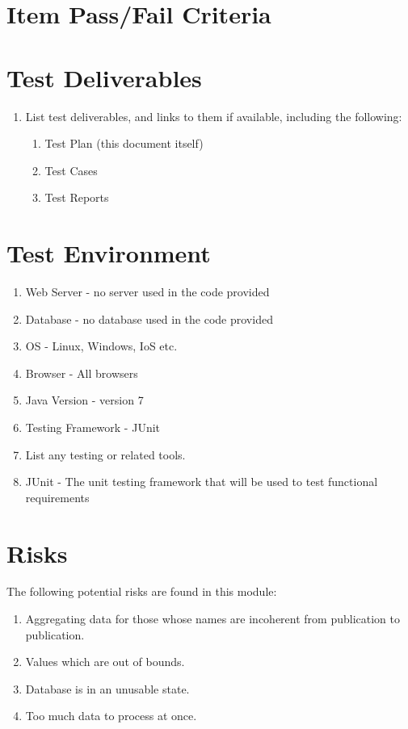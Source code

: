 \section{Item Pass/Fail Criteria}
  

\section{Test Deliverables}

\begin{enumerate}
	\item List test deliverables, and links to them if available, including the following:

\begin{enumerate}
	\item Test Plan (this document itself)
	\item Test Cases 
	\item Test Reports
\end{enumerate}
\end{enumerate} 
\section{Test Environment} 

\begin{enumerate} 
	\item Web Server - no server used in the code provided
	\item Database - no database used in the code provided
	\item OS - Linux, Windows, IoS etc.
	\item Browser - All browsers
	\item Java Version - version 7
	\item Testing Framework - JUnit
	\item List any testing or related tools.
	\item JUnit - The unit testing framework that will be used to test functional requirements
\end{enumerate}

\section{Risks}
	The following potential risks are found in this module:
\begin{enumerate}
	\item Aggregating data for those whose names are incoherent from publication to publication.
	\item Values  which are out of bounds.
	\item Database is in an unusable state.
	\item Too much data to process at once.
\end{enumerate}

